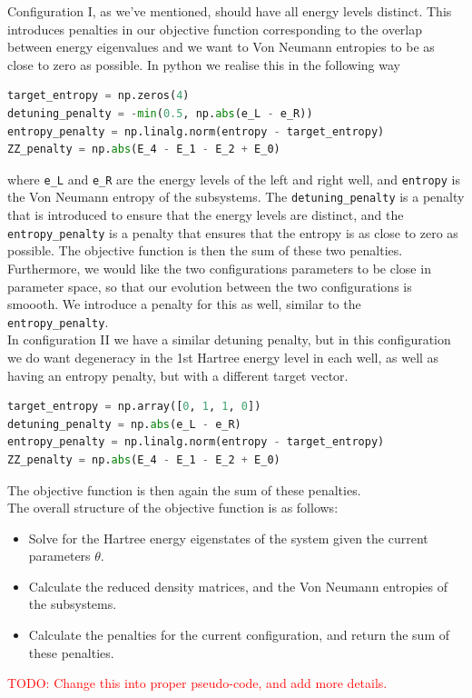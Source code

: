 \documentclass{subfiles}
\begin{document}
Configuration I, as we've mentioned, should have all energy levels distinct. This introduces penalties in our objective function corresponding to the overlap between energy eigenvalues and we want to Von Neumann entropies to be as close to zero as possible. In python we realise this in the following way
\begin{lstlisting}[language=Python]
target_entropy = np.zeros(4)
detuning_penalty = -min(0.5, np.abs(e_L - e_R))
entropy_penalty = np.linalg.norm(entropy - target_entropy)
ZZ_penalty = np.abs(E_4 - E_1 - E_2 + E_0)
\end{lstlisting}
where \texttt{e\_L} and \texttt{e\_R} are the energy levels of the left and right well, and \texttt{entropy} is the Von Neumann entropy of the subsystems. The \texttt{detuning\_penalty} is a penalty that is introduced to ensure that the energy levels are distinct, and the \texttt{entropy\_penalty} is a penalty that ensures that the entropy is as close to zero as possible. The objective function is then the sum of these two penalties. Furthermore, we would like the two configurations parameters to be close in parameter space, so that our evolution between the two configurations is smoooth. We introduce a penalty for this as well, similar to the \texttt{entropy\_penalty}.
\\ In configuration II we have a similar detuning penalty, but in this configuration we do want degeneracy in the 1st Hartree energy level in each well, as well as having an entropy penalty, but with a different target vector. 
\begin{lstlisting}[language=Python]
target_entropy = np.array([0, 1, 1, 0])
detuning_penalty = np.abs(e_L - e_R)
entropy_penalty = np.linalg.norm(entropy - target_entropy)
ZZ_penalty = np.abs(E_4 - E_1 - E_2 + E_0)
\end{lstlisting}
The objective function is then again the sum of these penalties. \\ 
The overall structure of the objective function is as follows:
\begin{itemize}
    \item Solve for the Hartree energy eigenstates of the system given the current parameters $\theta$.
    \item Calculate the reduced density matrices, and the Von Neumann entropies of the subsystems.
    \item Calculate the penalties for the current configuration, and return the sum of these penalties.
\end{itemize}
\textcolor{red}{TODO: Change this into proper pseudo-code, and add more details.}
\end{document}
